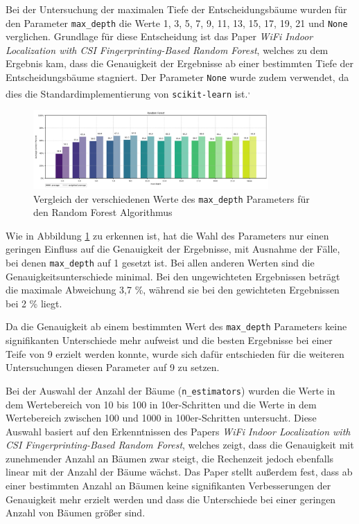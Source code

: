 Bei der Untersuchung der maximalen Tiefe der Entscheidungsbäume wurden für den Parameter \texttt{max\_depth} die Werte 1, 3, 5, 7, 9, 11, 13, 15, 17, 19, 21 und \texttt{None} verglichen. Grundlage für diese Entscheidung ist das Paper \textit{WiFi Indoor Localization with CSI Fingerprinting-Based Random Forest}, welches zu dem Ergebnis kam, dass die Genauigkeit der Ergebnisse ab einer bestimmten Tiefe der Entscheidungsbäume stagniert. Der Parameter \texttt{None} wurde zudem verwendet, da dies die Standardimplementierung von \texttt{scikit-learn} ist.\textsuperscript{,}

\begin{figure}[H]
    \centering
    \includegraphics[width=0.8\textwidth]{images/03_random_forest_max_depth_03.png}
    \caption{Vergleich der verschiedenen Werte des \texttt{max\_depth} Parameters für den Random Forest Algorithmus}
    \label{fig:03_random_forest_max_depth_03}
\end{figure}

Wie in Abbildung \ref{fig:03_random_forest_max_depth_03} zu erkennen ist, hat die Wahl des Parameters nur einen geringen Einfluss auf die Genauigkeit der Ergebnisse, mit Ausnahme der Fälle, bei denen \texttt{max\_depth} auf 1 gesetzt ist. Bei allen anderen Werten sind die Genauigkeitsunterschiede minimal. Bei den ungewichteten Ergebnissen beträgt die maximale Abweichung 3,7 \%, während sie bei den gewichteten Ergebnissen bei 2 \% liegt.

Da die Genauigkeit ab einem bestimmten Wert des \texttt{max\_depth} Parameters keine signifikanten Unterschiede mehr aufweist und die besten Ergebnisse bei einer Teife von 9 erzielt werden konnte, wurde sich dafür entschieden für die weiteren Untersuchungen diesen Parameter auf 9 zu setzen.


Bei der Auswahl der Anzahl der Bäume (\texttt{n\_estimators}) wurden die Werte in dem Wertebereich von 10 bis 100 in 10er-Schritten und die Werte in dem Wertebereich zwischen 100 und 1000 in 100er-Schritten untersucht. Diese Auswahl basiert auf den Erkenntnissen des Papers \textit{WiFi Indoor Localization with CSI Fingerprinting-Based Random Forest}, welches zeigt, dass die Genauigkeit mit zunehmender Anzahl an Bäumen zwar steigt, die Rechenzeit jedoch ebenfalls linear mit der Anzahl der Bäume wächst. Das Paper stellt außerdem fest, dass ab einer bestimmten Anzahl an Bäumen keine signifikanten Verbesserungen der Genauigkeit mehr erzielt werden und dass die Unterschiede bei einer geringen Anzahl von Bäumen größer sind.

